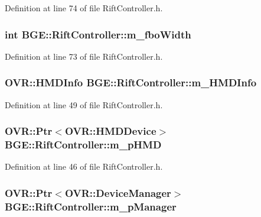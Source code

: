Definition at line 74 of file Rift\-Controller.\-h.

\hypertarget{class_b_g_e_1_1_rift_controller_a25129282cc3e860814de35f9ba45986e}{
\subsubsection[{m\-\_\-fbo\-Width}]{\setlength{\rightskip}{0pt plus 5cm}int B\-G\-E\-::\-Rift\-Controller\-::m\-\_\-fbo\-Width}}\label{class_b_g_e_1_1_rift_controller_a25129282cc3e860814de35f9ba45986e}


Definition at line 73 of file Rift\-Controller.\-h.

\hypertarget{class_b_g_e_1_1_rift_controller_a9d02073c01d376140e65952ae7676d55}{
\subsubsection[{m\-\_\-\-H\-M\-D\-Info}]{\setlength{\rightskip}{0pt plus 5cm}O\-V\-R\-::\-H\-M\-D\-Info B\-G\-E\-::\-Rift\-Controller\-::m\-\_\-\-H\-M\-D\-Info}}\label{class_b_g_e_1_1_rift_controller_a9d02073c01d376140e65952ae7676d55}


Definition at line 49 of file Rift\-Controller.\-h.

\hypertarget{class_b_g_e_1_1_rift_controller_a70060a4cca185240ef637898fe58a9a4}{
\subsubsection[{m\-\_\-p\-H\-M\-D}]{\setlength{\rightskip}{0pt plus 5cm}O\-V\-R\-::\-Ptr$<$O\-V\-R\-::\-H\-M\-D\-Device$>$ B\-G\-E\-::\-Rift\-Controller\-::m\-\_\-p\-H\-M\-D}}\label{class_b_g_e_1_1_rift_controller_a70060a4cca185240ef637898fe58a9a4}


Definition at line 46 of file Rift\-Controller.\-h.

\hypertarget{class_b_g_e_1_1_rift_controller_a08d378cc60cf780d041a732e11d69bce}{
\subsubsection[{m\-\_\-p\-Manager}]{\setlength{\rightskip}{0pt plus 5cm}O\-V\-R\-::\-Ptr$<$O\-V\-R\-::\-Device\-Manager$>$ B\-G\-E\-::\-Rift\-Controller\-::m\-\_\-p\-Manager}}\label{class_b_g_e_1_1_rift_controller_a08d378cc60cf780d041a732e11d69bce}


